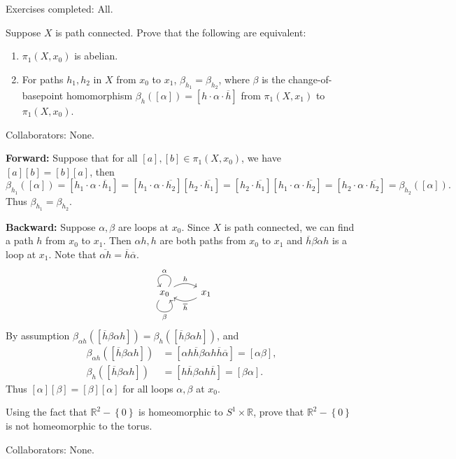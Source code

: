 \documentclass[twoside,10pt]{report}
\begin{document}

{\color{blue}Exercises completed: All.}

\begin{exer}[]
Suppose $X$ is path connected. Prove that the following are equivalent:
\begin{enumerate}
	\item $\pi_1(X,x_0)$ is abelian.
	\item For paths $h_1,h_2$ in $X$ from $x_0$ to $x_1$, $\beta_{h_1}=\beta_{h_2}$, where $\beta$ is the change-of-basepoint homomorphism $\beta_{h}([\alpha])=[h\cdot\alpha\cdot\overline{h}]$ from $\pi_1(X,x_1)$ to $\pi_1(X,x_0)$.
\end{enumerate}
\end{exer}
{\color{blue}Collaborators: None.}

\textbf{Forward:} Suppose that for all $[a],[b] \in \pi_1(X,x_0)$, we have $[a][b]=[b][a]$, then
\[
	\beta_{h_1}([\alpha]) = [h_1\cdot \alpha\cdot \overline{h}_1]=[h_1\cdot \alpha\cdot\overline{h_2}][h_2\cdot \overline{h_1}]= [h_2\cdot \overline{h_1}][h_1\cdot \alpha \cdot\overline{h_2}] = [h_2\cdot \alpha\cdot \overline{h_2}]=\beta_{h_2}([\alpha]).
\] Thus $\beta_{h_1}=\beta_{h_2}$.

\textbf{Backward:} Suppose $\alpha,\beta$ are loops at $x_0$. Since $X$ is path connected, we can find a path $h$ from $x_0$ to $x_1$. Then $\alpha h, h$ are both paths from $x_0$ to $x_1$ and $\overline{h}\beta\alpha h$ is a loop at $x_1$. Note that $\overline{\alpha h}=\overline{h}\overline{\alpha}$.
\[
\begin{tikzcd}
	x_0 \arrow[r, "h", bend left] \arrow["\beta"', loop, distance=2em, in=305, out=235] \arrow["\alpha"', loop, distance=2em, in=125, out=55] & x_1 \arrow[l, "\overline{h}", bend left]
\end{tikzcd}
\] 
By assumption $\beta_{\alpha h}([\overline{h}\beta\alpha h]) = \beta_{h}([\overline{h}\beta\alpha h])$, and
\begin{align*}
	\beta_{\alpha h}([\overline{h}\beta\alpha h]) &= [\alpha h \overline{h} \beta\alpha h \overline{h}\overline{\alpha}] = [\alpha \beta], \\
	\beta_{h}([\overline{h}\beta\alpha h]) &= [h \overline{h}\beta\alpha h \overline{h}]=[\beta\alpha].
\end{align*}
Thus $[\alpha][\beta]=[\beta][\alpha]$ for all loops $\alpha,\beta$ at $x_0$.

\newpage
\begin{exer}[]
Using the fact that $\mathbb{R}^{2}-\left\{ 0 \right\}$ is homeomorphic to $S^{1}\times \mathbb{R}$, prove that $\mathbb{R}^{2}-\left\{ 0 \right\}$ is not homeomorphic to the torus.
\end{exer}
{\color{blue}Collaborators: None.}
\end{document}
